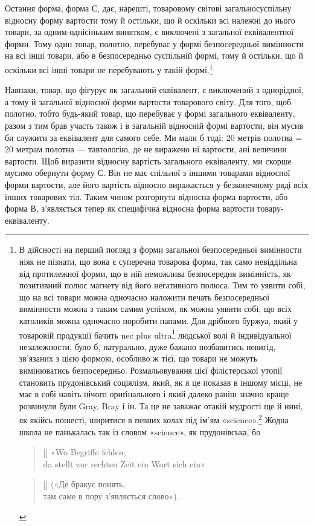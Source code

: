 Остання форма, форма С, дає, нарешті, товаровому світові
загальносуспільну відносну форму вартости тому й остільки,
що й оскільки всі належні до нього товари, за одним-однісіньким
винятком, є виключені з загальної еквівалентної форми. Тому
один товар, полотно, перебуває у формі безпосередньої вимінности
на всі інші товари, або в безпосередньо суспільній формі, тому
й остільки, що й оскільки всі інші товари не перебувають у такій
формі.\footnote{
В дійсності на перший погляд з форми загальної безпосередньої
вимінности ніяк не пізнати, що вона є суперечна товарова форма, так
само невіддільна від протилежної форми, що в ній неможлива безпосередня
вимінність, як позитивний полюс магнету від його негативного полюса.
Тим то уявити собі, що на всі товари можна одночасно наложити печать
безпосередньої вимінности можна з таким самим успіхом, як можна
уявити собі, що всіх католиків можна одночасно поробити папами. Для
дрібного буржуа, який у товаровій продукції бачить nec plus ultra\footnote*{
— вершину. \emph{Ред}} людської волі й індивідуальної незалежности, було б, натурально, дуже
бажано позбавитись невигід, зв’язаних з цією формою, особливо ж тієї, що
товари не можуть вимінюватись безпосередньо. Розмальовування цієї філістерської
утопії становить прудонівський соціялізм, який, як я це показав
в іншому місці, не має в собі навіть нічого ориґінального і який далеко
раніш значно краще розвинули були Gray, Bray і ін. Та це не заважає
отакій мудрості ще й нині, як якійсь пошесті, ширитися в певних колах
під ім’ям «science».\footnote*{— «наука». \emph{Ред.}}
Жодна школа не панькалась так із словом «science», як прудонівська, бо
\settowidth{\versewidth}{da stellt zur rechten Zeit ein Wort sich ein»}
\begin{verse}[\versewidth]
«Wo Begriffe fehlen,\\
da stellt zur rechten Zeit ein Wort sich ein»
\end{verse}
\begin{verse}[\versewidth]
(«Де бракує понять,\\
там саме в пору з’являється слово»).
\end{verse}
}

Навпаки, товар, що фігурує як загальний еквівалент, є виключений
з однорідної, а тому й загальної відносної форми вартости
товарового світу. Для того, щоб полотно, тобто будь-який
товар, що перебуває у формі загального еквіваленту, разом з тим
брав участь також і в загальній відносній формі вартости, він
мусив би служити за еквівалент для самого себе. Ми мали б тоді:
20 метрів полотна = 20 метрам полотна — тавтологію, де не виражено
ні вартости, ані величини вартости. Щоб виразити відносну
вартість загального еквіваленту, ми скорше мусимо обернути
форму С. Він не має спільної з іншими товарами відносної
форми вартости, але його вартість відносно виражається у безконечному
ряді всіх інших товарових тіл. Таким чином розгорнута
відносна форма вартости, або форма В, з’являється тепер
як специфічна відносна форма вартости товару-еквіваленту.

